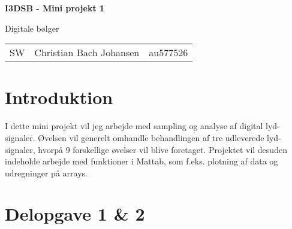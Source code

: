 \documentclass{article}
\begin{document}

\begin{titlepage}
    
    \begin{center}
        \vspace*{1cm}
 
        \Huge
        \textbf{I3DSB - Mini projekt 1}
 
        \vspace{0.5cm}
        \huge
        Digitale bølger \\
        \date\today
 
        \vspace{1.5cm}
 
        \large
        \begin{tabular}{c|lr}
	    SW & Christian Bach Johansen & au577526\\
        \end{tabular}
        
        
        \vfill
        \vspace{2cm}
 
    \end{center}
\end{titlepage}

\newpage
\newpage

\setcounter{page}{1}


\section{Introduktion}

I dette mini projekt vil jeg arbejde med sampling og analyse af digital lyd-signaler. Øvelsen vil generelt omhandle behandlingen af tre udleverede lyd-signaler, hvorpå 9 forskellige øvelser vil blive foretaget. Projektet vil desuden indeholde arbejde med funktioner i Mattab, som f.eks. plotning af data og udregninger på arrays.

\section{Delopgave 1 \& 2}


\end{document}
